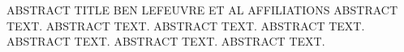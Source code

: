 \begin{conf-abstract}
{ABSTRACT TITLE}
{BEN LEFEUVRE ET AL}
{AFFILIATIONS}
{ABSTRACT TEXT. ABSTRACT TEXT. ABSTRACT TEXT. ABSTRACT TEXT. ABSTRACT TEXT. ABSTRACT TEXT. ABSTRACT TEXT.}
\end{conf-abstract}
